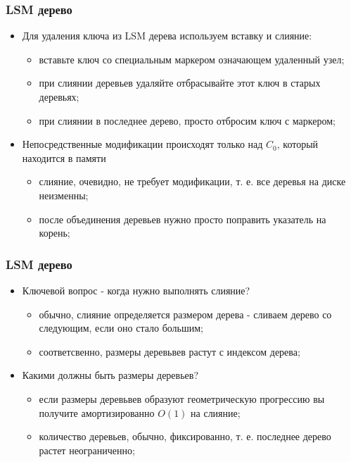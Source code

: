 \begin{frame}
\frametitle{LSM дерево}
\begin{itemize}
  \item<1-> Для удаления ключа из LSM дерева используем вставку и слияние:
    \begin{itemize}
      \item вставьте ключ со специальным маркером означающем удаленный узел;
      \item при слиянии деревьев удаляйте отбрасывайте этот ключ в старых деревьях;
      \item при слиянии в последнее дерево, просто отбросим ключ с маркером;
    \end{itemize}
  \item<2-> Непосредственные модификации происходят только над $C_0$, который находится в памяти
    \begin{itemize}
      \item слияние, очевидно, не требует модификации, т. е. все деревья на диске неизменны;
      \item после объединения деревьев нужно просто поправить указатель на корень;
    \end{itemize}
\end{itemize}
\end{frame}

\begin{frame}
\frametitle{LSM дерево}
\begin{itemize}
  \item<1-> Ключевой вопрос - когда нужно выполнять слияние?
    \begin{itemize}
      \item обычно, слияние определяется размером дерева - сливаем дерево со следующим, если оно стало большим;
      \item соответсвенно, размеры деревьвев растут с индексом дерева;
    \end{itemize}
  \item<2-> Какими должны быть размеры деревьев?
    \begin{itemize}
      \item если размеры деревьвев образуют геометрическую прогрессию вы получите амортизированно $O(1)$ на слияние;
      \item количество деревьев, обычно, фиксированно, т. е. последнее дерево растет неограниченно;
    \end{itemize}
\end{itemize}
\end{frame}

